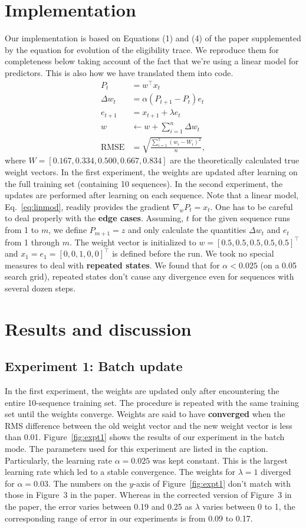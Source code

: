 \documentclass[conference]{IEEEtran}
\begin{document}
\section{Implementation}
Our implementation is based on Equations (1) and (4) of the paper supplemented by the equation for evolution of the eligibility trace. We reproduce them for completeness below taking account of the fact that we're using a linear model for predictors. This is also how we have translated them into code.
\begin{align}
P_t &= w^\intercal x_t \label{eq:linmod}\\
\Delta w_t &= \alpha(P_{t+1} - P_t)e_t \\
e_{t+1} &= x_{t+1} +\lambda e_t\\
w &\leftarrow w + \sum_{i=1}^n\Delta w_t\\
\text{RMSE} &= \sqrt{\frac{\sum_{i=1}^5(w_i - W_i)^2}{n}},
\end{align}
where $W = [0.167, 0.334, 0.500, 0.667, 0.834]$ are the theoretically calculated true weight vectors. In the first experiment, the weights are updated after learning on the full training set (containing 10 sequences). In the second experiment, the updates are performed after learning on each sequence. Note that a linear model, Eq.~\eqref{eq:linmod}, readily provides the gradient $\nabla_wP_t = x_t$. One has to be careful to deal properly with the {\bf edge cases}. Assuming, $t$ for the given sequence runs from 1 to $m$, we define $P_{m+1} = z$ and only calculate the quantities $\Delta w_t$ and $e_t$ from 1 through $m$. The weight vector is initialized to $w=[0.5, 0.5, 0.5, 0.5, 0.5]^\intercal$ and $x_1 = e_1 = [0,0,1,0,0]^\intercal$ is defined before the run. We took no special measures to deal with {\bf repeated states}. We found that for $\alpha<0.025$ (on a 0.05 search grid), repeated states don't cause any divergence even for sequences with several dozen steps.
\section{Results and discussion}
\subsection{Experiment 1: Batch update}
In the first experiment, the weights are updated only after encountering the entire 10-sequence training set. The procedure is repeated with the same training set until the weights converge. Weights are said to have {\bf converged} when the RMS difference between the old weight vector and the new weight vector is less than 0.01. Figure~\ref{fig:expt1} shows the results of our experiment in the batch mode. The parameters used for this experiment are listed in the caption. Particularly, the learning rate $\alpha = 0.025$ was kept constant. This is the largest learning rate which led to a stable convergence. The weights for $\lambda = 1$ diverged for $\alpha = 0.03$. The numbers on the $y$-axis of Figure~\ref{fig:expt1} don't match with those in Figure~3 in the paper. Whereas in the corrected version of Figure~3 in the paper, the error varies between 0.19 and 0.25 as $\lambda$ varies between 0 to 1, the corresponding range of error in our experiments is from 0.09 to 0.17. 
\end{document}
